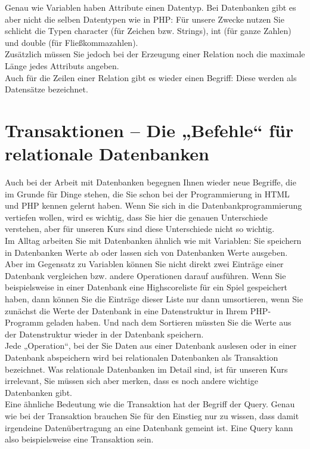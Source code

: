 Genau wie Variablen haben Attribute einen Datentyp. Bei Datenbanken gibt es aber nicht die selben Datentypen wie in PHP: Für unsere Zwecke nutzen Sie schlicht die Typen character (für Zeichen bzw. Strings), int (für ganze Zahlen) und double (für Fließkommazahlen).\\

Zusätzlich müssen Sie jedoch bei der Erzeugung einer Relation noch die maximale Länge jedes Attributs angeben.\\

Auch für die Zeilen einer Relation gibt es wieder einen Begriff: Diese werden als Datensätze bezeichnet.

\section{Transaktionen – Die „Befehle“ für relationale Datenbanken}

Auch bei der Arbeit mit Datenbanken begegnen Ihnen wieder neue Begriffe, die im Grunde für Dinge stehen, die Sie schon bei der Programmierung in HTML und PHP kennen gelernt haben. Wenn Sie sich in die Datenbankprogrammierung vertiefen wollen, wird es wichtig, dass Sie hier die genauen Unterschiede verstehen, aber für unseren Kurs sind diese Unterschiede nicht so wichtig.\\

Im Alltag arbeiten Sie mit Datenbanken ähnlich wie mit Variablen: Sie speichern in Datenbanken Werte ab oder lassen sich von Datenbanken Werte ausgeben. Aber im Gegensatz zu Variablen können Sie nicht direkt zwei Einträge einer Datenbank vergleichen bzw. andere Operationen darauf ausführen. Wenn Sie beispielsweise in einer Datenbank eine Highscoreliste für ein Spiel gespeichert haben, dann können Sie die Einträge dieser Liste nur dann umsortieren, wenn Sie zunächst die Werte der Datenbank in eine Datenstruktur in Ihrem PHP-Programm geladen haben. Und nach dem Sortieren müssten Sie die Werte aus der Datenstruktur wieder in der Datenbank speichern.\\

Jede „Operation“, bei der Sie Daten aus einer Datenbank auslesen oder in einer Datenbank abspeichern wird bei relationalen Datenbanken als Transaktion bezeichnet. Was relationale Datenbanken im Detail sind, ist für unseren Kurs irrelevant, Sie müssen sich aber merken, dass es noch andere wichtige Datenbanken gibt.\\

Eine ähnliche Bedeutung wie die Transaktion hat der Begriff der Query. Genau wie bei der Transaktion brauchen Sie für den Einstieg nur zu wissen, dass damit irgendeine Datenübertragung an eine Datenbank gemeint ist. Eine Query kann also beispielsweise eine Transaktion sein.\\

